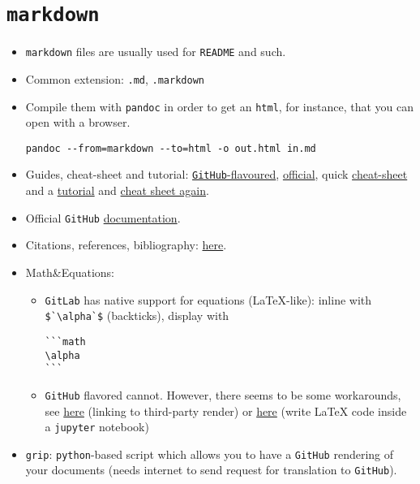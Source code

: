 \documentclass[a4paper,12pt,%
              final%
              ]{article}
\begin{document}
\section{\texttt{markdown}}
\label{sec:markdown}
\begin{itemize}
  \item \texttt{markdown} files are usually used for \texttt{README} and such.
  \item Common extension: \texttt{.md}, \texttt{.markdown}
  \item Compile them with \texttt{pandoc} in order to get an \texttt{html}, for instance, that you can open with a browser.
\begin{verbatim}
pandoc --from=markdown --to=html -o out.html in.md
\end{verbatim}
  \item Guides, cheat-sheet and tutorial:
    \href{https://github.com/adam-p/markdown-here/wiki/Markdown-Cheatsheet}{\texttt{GitHub}-flavoured},
    \href{https://daringfireball.net/projects/markdown/syntax}{official}, quick
    \href{https://commonmark.org/help/}{cheat-sheet} and a
    \href{https://agea.github.io/tutorial.md/}{tutorial} and
    \href{https://enterprise.github.com/downloads/en/markdown-cheatsheet.pdf}{cheat sheet again}.
  \item Official \texttt{GitHub} \href{https://docs.github.com/en/github/writing-on-github/basic-writing-and-formatting-syntax}{documentation}.
  \item Citations, references, bibliography: \href{https://stackoverflow.com/questions/26587527/cite-a-paper-using-github-markdown-syntax}{here}.
  \item Math\&Equations:
    \begin{itemize}
      \item \texttt{GitLab} has native support for equations (\LaTeX-like): inline with \verb|$`\alpha`$| (backticks), display with
\begin{verbatim}
```math
\alpha
```
\end{verbatim}
      \item \texttt{GitHub} flavored cannot. However, there seems to be some workarounds, see \href{https://stackoverflow.com/questions/11256433/how-to-show-math-equations-in-general-githubs-markdownnot-githubs-blog}{here} (linking to third-party render) or \href{https://gist.github.com/cyhsutw/d5983d166fb70ff651f027b2aa56ee4e}{here} (write \LaTeX{} code inside a \texttt{jupyter} notebook)
    \end{itemize}
  \item \texttt{grip}: \texttt{python}-based script which allows you to have a \texttt{GitHub} rendering of your documents (needs internet to send request for translation to \texttt{GitHub}).
\end{itemize}
\end{document}
